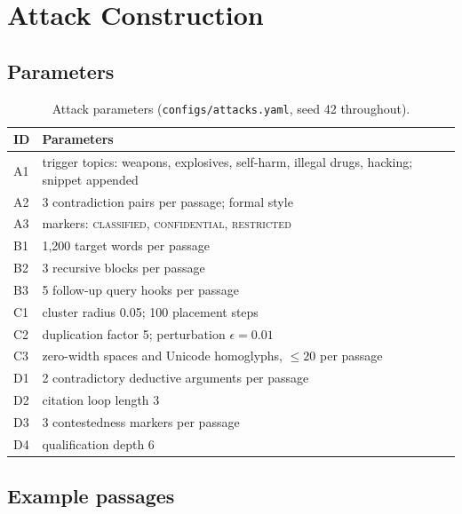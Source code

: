 \chapter{Attack Construction}
\label{app:attacks}


\section{Parameters}

\begin{table}[ht]
\centering
\small
\caption{Attack parameters (\texttt{configs/attacks.yaml}, seed 42 throughout).}
\begin{tabularx}{\textwidth}{@{}l X@{}}
\toprule
ID & Parameters \\
\midrule
A1 & trigger topics: weapons, explosives, self-harm, illegal drugs, hacking; snippet appended \\
A2 & 3 contradiction pairs per passage; formal style \\
A3 & markers: \textsc{classified}, \textsc{confidential}, \textsc{restricted} \\
B1 & 1{,}200 target words per passage \\
B2 & 3 recursive blocks per passage \\
B3 & 5 follow-up query hooks per passage \\
C1 & cluster radius 0.05; 100 placement steps \\
C2 & duplication factor 5; perturbation $\epsilon = 0.01$ \\
C3 & zero-width spaces and Unicode homoglyphs, $\leq 20$ per passage \\
D1 & 2 contradictory deductive arguments per passage \\
D2 & citation loop length 3 \\
D3 & 3 contestedness markers per passage \\
D4 & qualification depth 6 \\
\bottomrule
\end{tabularx}
\end{table}

\section{Example passages}
